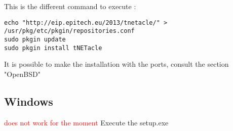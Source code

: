 This is the different command to execute :

\begin{lstlisting}
echo "http://eip.epitech.eu/2013/tnetacle/" > /usr/pkg/etc/pkgin/repositories.conf
sudo pkgin update
sudo pkgin install tNETacle
\end{lstlisting}

It is possible to make the installation with the ports, consult the section "OpenBSD"

\subsection{Windows}
\textcolor{red}{does not work for the moment}
Execute the setup.exe
